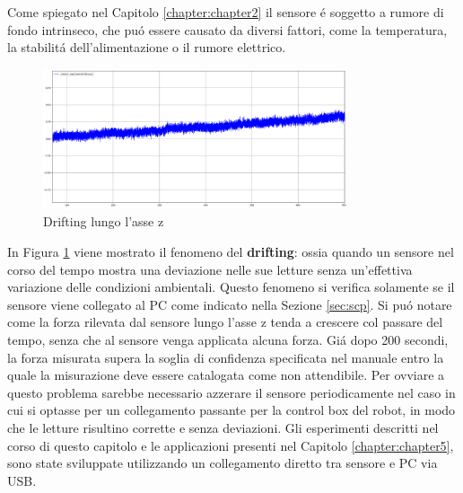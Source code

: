 Come spiegato nel Capitolo \ref{chapter:chapter2} il sensore \'{e} soggetto a rumore di fondo intrinseco, che 
pu\'{o} essere causato da diversi fattori, come la temperatura, la stabilit\'{a} dell'alimentazione o il rumore elettrico. 
\begin{figure}[H]
    \centering
    \includegraphics*[width=0.80\textwidth]{images/drifting.png}
    \caption{Drifting lungo l'asse z}
    \label{fig:drifting}
\end{figure}
In Figura \ref{fig:drifting} viene mostrato il fenomeno del \textbf{drifting}: ossia quando un sensore nel corso del tempo 
mostra una deviazione nelle sue letture senza un'effettiva variazione delle condizioni ambientali. Questo fenomeno si verifica 
solamente se il sensore viene collegato al PC come indicato nella Sezione \ref{sec:scp}. 
Si pu\'{o} notare come la forza rilevata dal sensore lungo l'asse z tenda a crescere col passare del tempo, senza che al sensore 
venga applicata alcuna forza. Gi\'{a} dopo 200 secondi, la forza misurata supera la soglia di confidenza specificata nel manuale 
entro la quale la misurazione deve essere catalogata come non attendibile.
Per ovviare a questo problema sarebbe necessario azzerare il sensore periodicamente nel caso in cui si optasse 
per un collegamento passante per la control box del robot, in modo che le letture risultino corrette e senza deviazioni. 
Gli esperimenti descritti nel corso di questo capitolo e le applicazioni presenti nel Capitolo \ref{chapter:chapter5}, sono state 
sviluppate utilizzando un collegamento diretto tra sensore e PC via USB.
